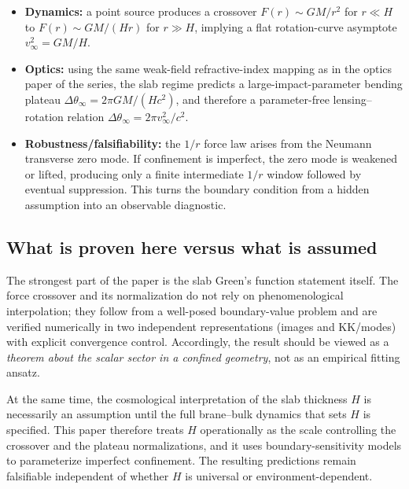 \documentclass[11pt]{article}
\begin{document}
\begin{itemize}
\item \textbf{Dynamics:} a point source produces a crossover
\(
F(r)\sim GM/r^2
\)
for $r\ll H$ to
\(
F(r)\sim GM/(Hr)
\)
for $r\gg H$, implying a flat rotation-curve asymptote
\(
v_\infty^2=GM/H.
\)

\item \textbf{Optics:} using the same weak-field refractive-index mapping as in the optics paper of
the series, the slab regime predicts a large-impact-parameter bending plateau
\(
\Delta\theta_\infty = 2\pi GM/(Hc^2)
\),
and therefore a parameter-free lensing--rotation relation
\(
\Delta\theta_\infty=2\pi v_\infty^2/c^2.
\)

\item \textbf{Robustness/falsifiability:} the $1/r$ force law arises from the Neumann transverse
zero mode.  If confinement is imperfect, the zero mode is weakened or lifted, producing only a
finite intermediate $1/r$ window followed by eventual suppression.  This turns the boundary
condition from a hidden assumption into an observable diagnostic.
\end{itemize}

\subsection{What is proven here versus what is assumed}
The strongest part of the paper is the slab Green's function statement itself.
The force crossover and its normalization do not rely on phenomenological interpolation; they follow
from a well-posed boundary-value problem and are verified numerically in two independent
representations (images and KK/modes) with explicit convergence control.
Accordingly, the result should be viewed as a \emph{theorem about the scalar sector in a confined
geometry}, not as an empirical fitting ansatz.

At the same time, the cosmological interpretation of the slab thickness $H$ is necessarily an
assumption until the full brane--bulk dynamics that sets $H$ is specified.
This paper therefore treats $H$ operationally as the scale controlling the crossover and the plateau
normalizations, and it uses boundary-sensitivity models to parameterize imperfect confinement.
The resulting predictions remain falsifiable independent of whether $H$ is universal or
environment-dependent.
\end{document}

